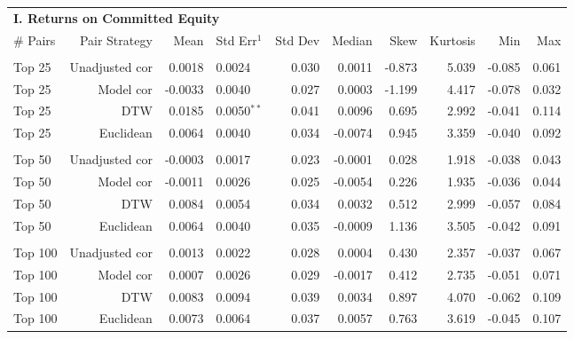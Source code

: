 \documentclass[12pt]{article}
\begin{document}
\begin{table}[hp]
    \fontsize{8pt}{8pt}\selectfont
    \centering
    \begin{tabular}{l r r l r r r r r r}
        \multicolumn{9}{l}{\textbf{I. Returns on Committed Equity}} \\
        \# Pairs & Pair Strategy & Mean & Std Err{$^{1}$} & Std Dev & Median & Skew & Kurtosis & Min & Max \\
        \hline
        \vspace{-1mm} \\
        Top 25    & Unadjusted cor &  0.0018 & 0.0024          & 0.030 &  0.0011 & -0.873 & 5.039 & -0.085 & 0.061 \\
        Top 25    & Model cor      & -0.0033 & 0.0040          & 0.027 &  0.0003 & -1.199 & 4.417 & -0.078 & 0.032 \\
        Top 25    & DTW            &  0.0185 & 0.0050{$^{**}$} & 0.041 &  0.0096 &  0.695 & 2.992 & -0.041 & 0.114 \\
        Top 25    & Euclidean      &  0.0064 & 0.0040          & 0.034 & -0.0074 &  0.945 & 3.359 & -0.040 & 0.092 \\
        \vspace{-1mm} \\
        Top 50    & Unadjusted cor & -0.0003 & 0.0017          & 0.023 & -0.0001 &  0.028 & 1.918 & -0.038 & 0.043 \\
        Top 50    & Model cor      & -0.0011 & 0.0026          & 0.025 & -0.0054 &  0.226 & 1.935 & -0.036 & 0.044 \\
        Top 50    & DTW            &  0.0084 & 0.0054          & 0.034 &  0.0032 &  0.512 & 2.999 & -0.057 & 0.084 \\
        Top 50    & Euclidean      &  0.0064 & 0.0040          & 0.035 & -0.0009 &  1.136 & 3.505 & -0.042 & 0.091 \\
        \vspace{-1mm} \\
        Top 100   & Unadjusted cor &  0.0013 & 0.0022          & 0.028 &  0.0004 &  0.430 & 2.357 & -0.037 & 0.067 \\
        Top 100   & Model cor      &  0.0007 & 0.0026          & 0.029 & -0.0017 &  0.412 & 2.735 & -0.051 & 0.071 \\
        Top 100   & DTW            &  0.0083 & 0.0094          & 0.039 &  0.0034 &  0.897 & 4.070 & -0.062 & 0.109 \\
        Top 100   & Euclidean      &  0.0073 & 0.0064          & 0.037 &  0.0057 &  0.763 & 3.619 & -0.045 & 0.107 \\

\end{tabular}
\end{table}
\end{document}
